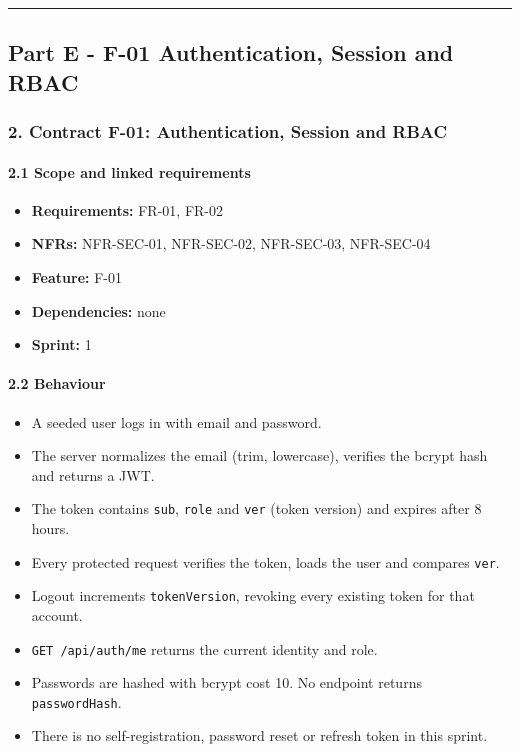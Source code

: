 \documentclass[12pt,a4paper]{article}
\begin{document}
\medskip\noindent\rule{\linewidth}{0.4pt}\medskip



\clearpage

\subsection*{Part E - F-01 Authentication, Session and RBAC}

\subsubsection*{2. Contract F-01: Authentication, Session and RBAC}
\paragraph*{2.1 Scope and linked requirements}
\begin{itemize}[leftmargin=*]
\item \textbf{Requirements:} FR-01, FR-02
\item \textbf{NFRs:} NFR-SEC-01, NFR-SEC-02, NFR-SEC-03, NFR-SEC-04
\item \textbf{Feature:} F-01
\item \textbf{Dependencies:} none
\item \textbf{Sprint:} 1
\end{itemize}

\paragraph*{2.2 Behaviour}
\begin{itemize}[leftmargin=*]
\item A seeded user logs in with email and password.
\item The server normalizes the email (trim, lowercase), verifies the bcrypt hash and returns a JWT.
\item The token contains \texttt{sub}, \texttt{role} and \texttt{ver} (token version) and expires after 8 hours.
\item Every protected request verifies the token, loads the user and compares \texttt{ver}.
\item Logout increments \texttt{tokenVersion}, revoking every existing token for that account.
\item \texttt{GET /api/auth/me} returns the current identity and role.
\item Passwords are hashed with bcrypt cost 10. No endpoint returns \texttt{passwordHash}.
\item There is no self-registration, password reset or refresh token in this sprint.
\end{itemize}
\end{document}
